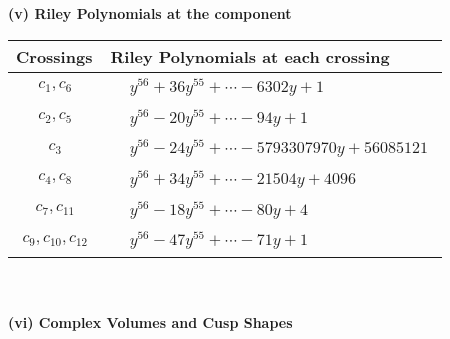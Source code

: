 \documentclass[1p]{elsarticle_modified}
\theoremstyle{definition}
\begin{document}
\newpage\renewcommand{\arraystretch}{1}
\flushleft \textbf{(v) Riley Polynomials at the component}\newline \\
\begin{tabular}{m{50pt}|m{274pt}}
Crossings & \hspace{64pt}Riley Polynomials at each crossing \\
\hline $$\begin{aligned}c_{1},c_{6}\end{aligned}$$&$\begin{aligned}
&y^{56}+36 y^{55}+\cdots-6302 y+1
\end{aligned}$\\
\hline $$\begin{aligned}c_{2},c_{5}\end{aligned}$$&$\begin{aligned}
&y^{56}-20 y^{55}+\cdots-94 y+1
\end{aligned}$\\
\hline $$\begin{aligned}c_{3}\end{aligned}$$&$\begin{aligned}
&y^{56}-24 y^{55}+\cdots-5793307970 y+56085121
\end{aligned}$\\
\hline $$\begin{aligned}c_{4},c_{8}\end{aligned}$$&$\begin{aligned}
&y^{56}+34 y^{55}+\cdots-21504 y+4096
\end{aligned}$\\
\hline $$\begin{aligned}c_{7},c_{11}\end{aligned}$$&$\begin{aligned}
&y^{56}-18 y^{55}+\cdots-80 y+4
\end{aligned}$\\
\hline $$\begin{aligned}c_{9},c_{10},c_{12}\end{aligned}$$&$\begin{aligned}
&y^{56}-47 y^{55}+\cdots-71 y+1
\end{aligned}$\\
\hline
\end{tabular}\\~\\
\newpage\flushleft \textbf{(vi) Complex Volumes and Cusp Shapes}
\end{document}

